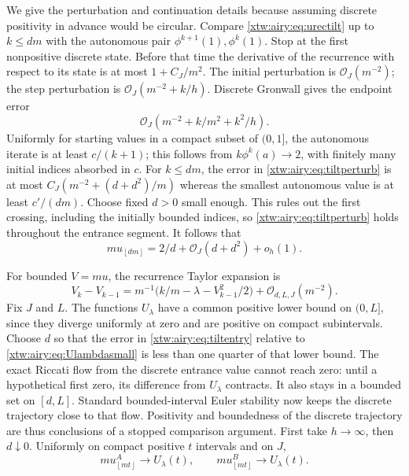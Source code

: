 \documentclass[11pt]{article}
\theoremstyle{remark}\newtheorem{remark}[theorem]{Remark}
\newcommand{\OO}{\mathcal O}
\newcommand{\floor}[1]{\left\lfloor #1\right\rfloor}
\begin{document}
We give the perturbation and continuation details because assuming discrete
positivity in advance would be circular. Compare \eqref{xtw:airy:eq:urectilt} up to
$k\le dm$ with the autonomous pair $\phi^{k+1}(1),\phi^k(1)$.
Stop at the first nonpositive discrete state. Before that time the derivative
of the recurrence with respect to its state is at most $1+C_J/m^2$.
The initial perturbation is $\OO_J(m^{-2})$; the step perturbation is
$\OO_J(m^{-2}+k/h)$. Discrete Gronwall gives the endpoint error
\begin{equation}\label{xtw:airy:eq:tiltperturb}
 \OO_J\!\left(m^{-2}+k/m^2+k^2/h\right).
\end{equation}
Uniformly for starting values in a compact subset of $(0,1]$, the autonomous
iterate is at least $c/(k+1)$; this follows from $k\phi^k(a)\to2$, with
finitely many initial indices absorbed in $c$. For $k\le dm$, the error in
\eqref{xtw:airy:eq:tiltperturb} is at most $C_J(m^{-2}+(d+d^2)/m)$ whereas the
smallest autonomous value is at least $c'/(dm)$. Choose fixed $d>0$ small
enough. This rules out the first crossing, including the initially bounded
indices, so \eqref{xtw:airy:eq:tiltperturb} holds throughout the entrance segment.
It follows that
\begin{equation}\label{xtw:airy:eq:tiltentry}
 mu_{\floor{dm}}=2/d+\OO_J(d+d^2)+o_h(1).
\end{equation}

For bounded $V=mu$, the recurrence Taylor expansion is
\[
 V_k-V_{k-1}=m^{-1}\bigl(k/m-\lambda-V_{k-1}^2/2\bigr)
                 +\OO_{d,L,J}(m^{-2}).
\]
Fix $J$ and $L$. The functions $U_\lambda$ have a common positive lower bound
on $(0,L]$, since they diverge uniformly at zero and are positive on compact
subintervals. Choose $d$ so that the error in \eqref{xtw:airy:eq:tiltentry} relative
to \eqref{xtw:airy:eq:Ulambdasmall} is less than one quarter of that lower bound.
The exact Riccati flow from the discrete entrance value cannot reach zero:
until a hypothetical first zero, its difference from $U_\lambda$ contracts.
It also stays in a bounded set on $[d,L]$. Standard bounded-interval Euler
stability now keeps the discrete trajectory close to that flow. Positivity
and boundedness of the discrete trajectory are thus conclusions of a stopped
comparison argument. First take $h\to\infty$, then $d\downarrow0$. Uniformly
on compact positive $t$ intervals and on $J$,
\begin{equation}\label{xtw:airy:eq:tiltentrance}
 mu_{\floor{mt}}^A\longrightarrow U_\lambda(t),\qquad
 mu_{\floor{mt}}^B\longrightarrow U_\lambda(t).
\end{equation}
\end{document}
